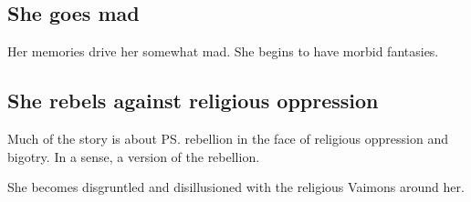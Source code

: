 \subsection{She goes mad}
Her \Malach{} memories drive her somewhat mad. 
She begins to have morbid fantasies. 










\subsection{She rebels against religious oppression}
Much of the story is about \ps{\Belzir}{} rebellion in the face of religious oppression and bigotry. 
In a sense, a  version of the \Merkyran{} rebellion. 

She becomes disgruntled and disillusioned with the religious Vaimons around her. 

